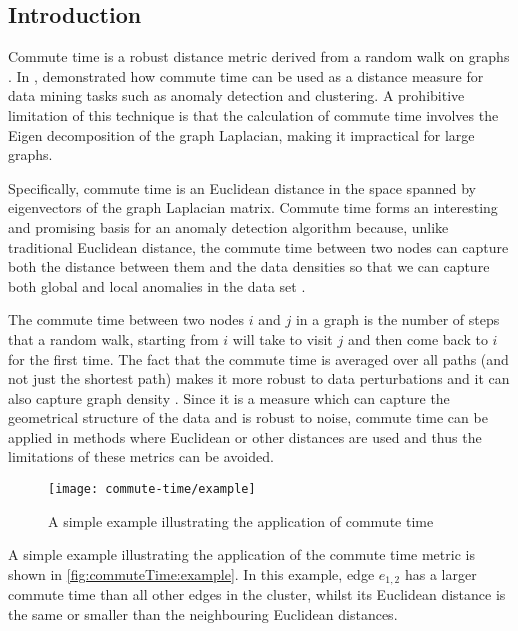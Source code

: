 \subsection{Introduction}
\label{commuteTime:introduction}
Commute time is a robust distance metric derived from a random walk on graphs
\cite{Khoa:2012}. In , \citeauthor{Khoa:2012} demonstrated
how commute time can be used as a distance measure for data mining tasks such as
anomaly detection and clustering. A prohibitive limitation of this technique is
that the calculation of commute time involves the Eigen decomposition of the
graph Laplacian, making it impractical for large graphs.

Specifically, commute time is an Euclidean distance in the space spanned by
eigenvectors of the graph Laplacian matrix. Commute time forms an interesting
and promising basis for an anomaly detection algorithm because, unlike
traditional Euclidean distance, the commute time between two nodes can capture
both the distance between them and the data densities so that we can capture
both global and local anomalies in the data set \cite{Khoa:2012}.

The commute time between two nodes $i$ and $j$ in a graph is the number of steps
that a random walk, starting from $i$ will take to visit $j$ and then come back
to $i$ for the first time. The fact that the commute time is averaged over all
paths (and not just the shortest path) makes it more robust to data
perturbations and it can also capture graph density \cite{Khoa:2012}. Since it
is a measure which can capture the geometrical structure of the data and is
robust to noise, commute time can be applied in methods where Euclidean or other
distances are used and thus the limitations of these metrics can be avoided.

\begin{figure}
    \centering
    \texttt{[image: commute-time/example]}
    \caption[A simple example illustrating the application of commute time]{A
        simple example illustrating the application of commute time
        \cite{Khoa:2012}}
    \label{fig:commuteTime:example}
\end{figure}

A simple example illustrating the application of the commute time metric is
shown in \autoref{fig:commuteTime:example}. In this example, edge $e_{1,2}$ has
a larger commute time than all other edges in the cluster, whilst its Euclidean
distance is the same or smaller than the neighbouring Euclidean distances.

